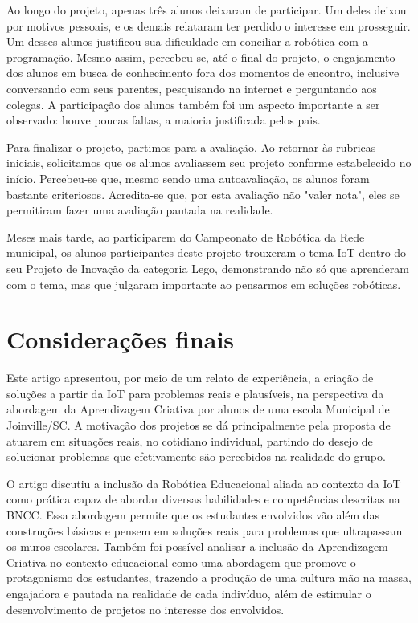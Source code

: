 \documentclass[portuguese]{textolivre}
\begin{document}
Ao longo do projeto, apenas três alunos deixaram de participar. Um deles deixou por motivos pessoais, e os demais relataram ter perdido o interesse em prosseguir. Um desses alunos justificou sua dificuldade em conciliar a robótica com a programação.
Mesmo assim, percebeu-se, até o final do projeto, o engajamento dos alunos em busca de conhecimento fora dos momentos de encontro, inclusive conversando com seus parentes, pesquisando na internet e perguntando aos colegas. A participação dos alunos também foi um aspecto importante a ser observado: houve poucas faltas, a maioria justificada pelos pais.

Para finalizar o projeto, partimos para a avaliação. Ao retornar às rubricas iniciais, solicitamos que os alunos avaliassem seu projeto conforme estabelecido no início. Percebeu-se que, mesmo sendo uma autoavaliação, os alunos foram bastante criteriosos. Acredita-se que, por esta avaliação não "valer nota", eles se permitiram fazer uma avaliação pautada na realidade.

Meses mais tarde, ao participarem do Campeonato de Robótica da Rede municipal, os alunos participantes deste projeto trouxeram o tema IoT dentro do seu Projeto de Inovação da categoria Lego, demonstrando não só que aprenderam com o tema, mas que julgaram importante ao pensarmos em soluções robóticas.

\section{Considerações finais}\label{sec:seventh}

Este artigo apresentou, por meio de um relato de experiência, a criação de soluções a partir da IoT para problemas reais e plausíveis, na perspectiva da abordagem da Aprendizagem Criativa por alunos de uma escola Municipal de Joinville/SC. A motivação dos projetos se dá principalmente pela proposta de atuarem em situações reais, no cotidiano individual, partindo do desejo de solucionar problemas que efetivamente são percebidos na realidade do grupo.

O artigo discutiu a inclusão da Robótica Educacional aliada ao contexto da IoT como prática capaz de abordar diversas habilidades e competências descritas na BNCC. Essa abordagem permite que os estudantes envolvidos vão além das construções básicas e pensem em soluções reais para problemas que ultrapassam os muros escolares. Também foi possível analisar a inclusão da Aprendizagem Criativa no contexto educacional como uma abordagem que promove o protagonismo dos estudantes, trazendo a produção de uma cultura mão na massa, engajadora e pautada na realidade de cada indivíduo, além de estimular o desenvolvimento de projetos no interesse dos envolvidos. 
\end{document}
